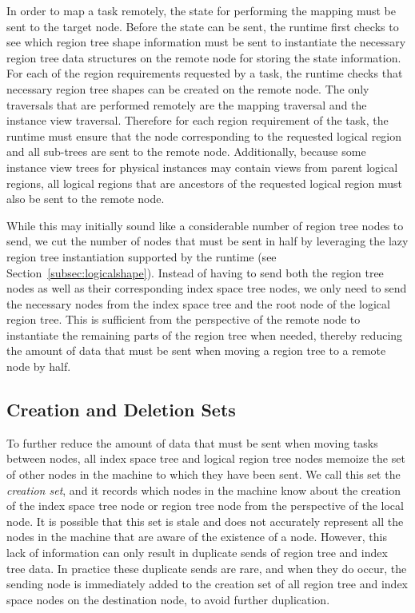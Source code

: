 In order to map a task remotely, the state
for performing the mapping must be sent to
the target node.  Before the state can be
sent, the runtime first checks to see which
region tree shape information must be sent
to instantiate the necessary region tree
data structures on the remote node for storing
the state information.  For each of the region
requirements requested by a task, the runtime
checks that necessary region tree shapes
can be created on the remote node. The only
traversals that are performed remotely are
the mapping traversal and the instance view
traversal.  Therefore for each region
requirement of the task, the runtime must 
ensure that the node corresponding to the
requested logical region and all sub-trees
are sent to the remote node. Additionally, 
because some instance view trees for physical
instances may contain views from parent logical
regions, all logical regions that are ancestors
of the requested logical region must also be
sent to the remote node.

While this may initially sound like a 
considerable number of region tree nodes
to send, we cut the number of nodes that
must be sent in half by leveraging the
lazy region tree instantiation supported
by the runtime (see 
Section~\ref{subsec:logicalshape}). 
Instead of having to send both the region
tree nodes as well as their corresponding
index space tree nodes, we only need to
send the necessary nodes from the index space
tree and the root node of the logical
region tree. This is sufficient from
the perspective of the remote node to 
instantiate the remaining parts of
the region tree when needed, thereby reducing 
the amount of data that must be sent
when moving a region tree to a remote node
by half.

\subsection{Creation and Deletion Sets}
\label{subsec:createsets}

To further reduce the amount of data that
must be sent when moving tasks between
nodes, all index space tree and logical
region tree nodes memoize the set of
other nodes in the machine to which they
have been sent. We call this set the 
{\em creation set}, and it records which
nodes in the machine know about the creation
of the index space tree node or region tree
node from the perspective of the local node.
It is possible that this set is stale and
does not accurately represent all the nodes
in the machine that are aware of the existence
of a node. However, this lack of information
can only result in duplicate sends of region
tree and index tree data. In practice these
duplicate sends are rare, and when they do
occur, the sending node is immediately added
to the creation set of all region tree and
index space nodes on the destination node,
to avoid further duplication.

